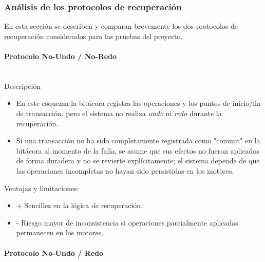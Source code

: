 \documentclass[12pt,letterpaper]{article}
\begin{document}
\subsubsection{Análisis de los protocolos de recuperación}

En esta sección se describen y comparan brevemente los dos protocolos de recuperación considerados para las pruebas del proyecto.

\paragraph{Protocolo No-Undo / No-Redo}\mbox{}\\

Descripción

\begin{itemize}
  \item En este esquema la bitácora registra las operaciones y los puntos de inicio/fin de transacción, pero el sistema no realiza \emph{undo} ni \emph{redo} durante la recuperación.
  \item Si una transacción no ha sido completamente registrada como "commit" en la bitácora al momento de la falla, se asume que sus efectos no fueron aplicados de forma duradera y no se revierte explícitamente; el sistema depende de que las operaciones incompletas no hayan sido persistidas en los motores.
\end{itemize}

Ventajas y limitaciones:

\begin{itemize}
  \item + Sencillez en la lógica de recuperación.
  \item - Riesgo mayor de inconsistencia si operaciones parcialmente aplicadas permanecen en los motores.
\end{itemize}

\paragraph{Protocolo No-Undo / Redo}\mbox{}\\
\end{document}
